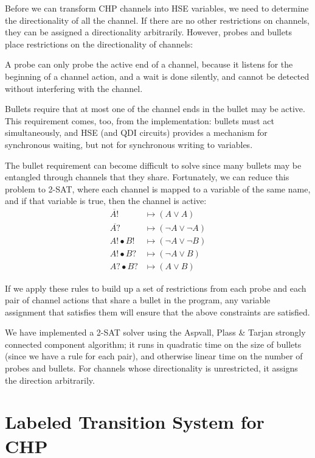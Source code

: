 \documentclass[times, 10pt]{article}
\begin{document}
Before we can transform CHP channels into HSE variables, we need to determine
the directionality of all the channel.  If there are no other restrictions on
channels, they can be assigned a directionality arbitrarily.  However, probes
and bullets place restrictions on the directionality of channels:

A probe can only probe the active end of a channel, because it listens for the
beginning of a channel action, and a wait is done silently, and cannot be
detected without interfering with the channel.

Bullets require that at most one of the channel ends in the bullet may be
active.  This requirement comes, too, from the implementation:  bullets must act
simultaneously, and HSE (and QDI circuits) provides a mechanism for synchronous
waiting, but not for synchronous writing to variables.

The bullet requirement can become difficult to solve since many bullets may be
entangled through channels that they share.  Fortunately, we can reduce this
problem to 2-SAT, where each channel is mapped to a variable of the same name,
and if that variable is true, then the channel is active:
\begin{align*}
\overline{A!} & \mapsto (A \lor A) \\
\overline{A?} & \mapsto (\lnot A \lor \lnot A) \\
A! \bullet B! & \mapsto (\lnot A \lor \lnot B) \\
A! \bullet B? & \mapsto (\lnot A \lor B) \\
A? \bullet B? & \mapsto (A \lor B)
\end{align*}

If we apply these rules to build up a set of restrictions from each probe and
each pair of channel actions that share a bullet in the program, any variable
assignment that satisfies them will ensure that the above constraints are
satisfied.

We have implemented a 2-SAT solver using the Aspvall, Plass \& Tarjan strongly
connected component algorithm; it runs in quadratic time on the size of bullets
(since we have a rule for each pair), and otherwise linear time on the number of
probes and bullets.  For channels whose directionality is unrestricted, it
assigns the direction arbitrarily.

\section{Labeled Transition System for CHP}
\end{document}
